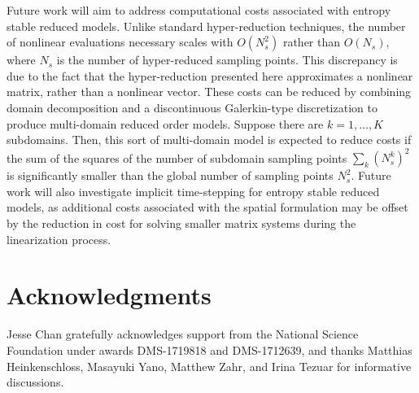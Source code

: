 \documentclass[preprint,10pt]{elsarticle}
\theoremstyle{definition}
\theoremstyle{lemma}
\theoremstyle{theorem}
\theoremstyle{assumption}
\begin{document}
Future work will aim to address computational costs associated with entropy stable reduced models.  Unlike standard hyper-reduction techniques, the number of nonlinear evaluations necessary scales with $O(N_s^2)$ rather than $O(N_s)$, where $N_s$ is the number of hyper-reduced sampling points.  This discrepancy is due to the fact that the hyper-reduction presented here approximates a nonlinear matrix, rather than a nonlinear vector.  These costs can be reduced by combining domain decomposition \cite{lucia2003reduced} and a discontinuous Galerkin-type discretization \cite{chan2017discretely} to produce multi-domain reduced order models.  Suppose there are $k = 1,\ldots, K$ subdomains.  Then, this sort of multi-domain model is expected to reduce costs if the sum of the squares of the number of subdomain sampling points $\sum_k (N_s^k)^2$ is significantly smaller than the global number of sampling points $N_s^2$.  Future work will also investigate implicit time-stepping for entropy stable reduced models, as additional costs associated with the spatial formulation may be offset by the reduction in cost for solving smaller matrix systems during the linearization process.

\section{Acknowledgments}

Jesse Chan gratefully acknowledges support from the National Science Foundation under awards DMS-1719818 and DMS-1712639, and thanks Matthias Heinkenschloss, Masayuki Yano, Matthew Zahr, and Irina Tezuar for informative discussions.



\end{document}
